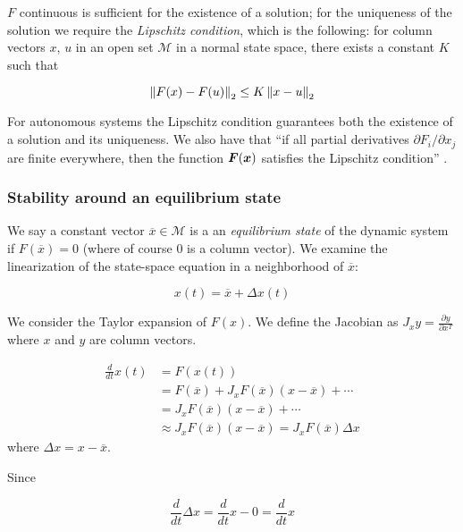 $F$ continuous is sufficient for the existence of a solution; for the uniqueness of the solution we require the \emph{Lipschitz condition}, which is the following: for column vectors $x$, $u$ in an open set $\mathcal{M}$ in a normal state space, there exists a constant $K$ such that

\begin{equation*}
\left\lVert F(x) - F(u) \right\rVert_2 \leq K\left\lVert x - u \right\rVert_2
\end{equation*}

For autonomous systems the Lipschitz condition guarantees both the existence of a solution and its uniqueness. We also have that ``if all partial derivatives $\partial F_i / \partial x_j$ are finite everywhere, then the function $\boldsymbol{F}(\boldsymbol{x})$ satisfies the Lipschitz condition'' \cite[p. 677]{Haykin:2009:NNC:1213811}.

\subsubsection{Stability around an equilibrium state}

We say a constant vector $\overline{x} \in \mathcal{M}$ is a an \emph{equilibrium state} of the dynamic system if $F(\overline{x}) = 0$ (where of course 0 is a column vector). We examine the linearization of the state-space equation in a neighborhood of $\overline{x}$:

\begin{equation*}
x(t) = \overline{x} + \Delta x(t)
\end{equation*}

We consider the Taylor expansion of $F(x)$. We define the Jacobian as $J_xy = \frac{\partial y}{\partial x^T}$ where $x$ and $y$ are column vectors.

\begin{align*}
  \frac{d}{dt}x(t) & = F(x(t)) \\
  & = F(\overline{x}) + J_x F(\overline{x})(x - \overline{x}) + \cdots \\
  & = J_x F(\overline{x})(x - \overline{x}) + \cdots \\
  & \approx J_x F(\overline{x})(x - \overline{x}) = J_x F(\overline{x}) \Delta x
\end{align*}
%
where $\Delta x = x - \overline{x}$.

Since

\begin{equation*}
  \frac{d}{dt}\Delta x = \frac{d}{dt} x - 0 = \frac{d}{dt} x
\end{equation*}

